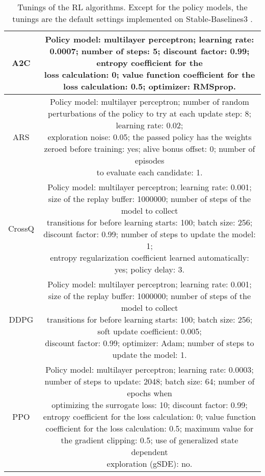 \documentclass[lettersize,journal]{IEEEtran}
\begin{document}
\begin{table*}
\centering
\caption{Tunings of the RL algorithms. Except for the policy models, the tunings are the default settings implemented on Stable-Baselines3 \cite{stable-baselines3}.}
\label{tab:RLtunings}
\begin{tabular}{cc} 
\hline
A2C & \makecell{Policy model: multilayer perceptron; learning rate: 0.0007; number of steps: 5; discount factor: 0.99; entropy coefficient for the \\ loss calculation: 0; value function coefficient for the loss calculation: 0.5; optimizer: RMSprop.} \\
\hline
ARS & \makecell{Policy model: multilayer perceptron; number of random perturbations of the policy to try at each update step: 8; learning rate: 0.02; \\ exploration noise: 0.05; the passed policy has the weights zeroed before training: yes; alive bonus offset: 0; number of episodes \\ to evaluate each candidate: 1.} \\
\hline
CrossQ & \makecell{Policy model: multilayer perceptron; learning rate: 0.001; size of the replay buffer: 1000000; number of steps of the model to collect \\ transitions for before learning starts: 100; batch size: 256; discount factor: 0.99; number of steps to update the model: 1; \\ entropy regularization coefficient learned automatically: yes; policy delay: 3.}\\
\hline
DDPG & \makecell{Policy model: multilayer perceptron; learning rate: 0.001; size of the replay buffer: 1000000; number of steps of the model to collect \\ transitions for before learning starts: 100; batch size: 256; soft update coefficient: 0.005;  \\ discount factor: 0.99; optimizer: Adam; number of steps to update the model: 1.} \\
\hline
PPO & \makecell{Policy model: multilayer perceptron; learning rate: 0.0003; number of steps to update: 2048; batch size: 64; number of epochs when \\ optimizing the surrogate loss: 10; discount factor: 0.99; entropy coefficient for the loss calculation: 0; value function \\ coefficient for the loss calculation: 0.5; maximum value for the gradient clipping: 0.5; use of generalized state dependent \\ exploration (gSDE): no.}\\

\end{tabular}
\end{table*}
\end{document}
